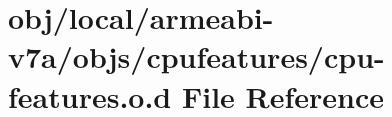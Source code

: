 \hypertarget{v7a_2objs_2cpufeatures_2cpu-features_8o_8d}{\section{obj/local/armeabi-\/v7a/objs/cpufeatures/cpu-\/features.o.\-d \-File \-Reference}
\label{v7a_2objs_2cpufeatures_2cpu-features_8o_8d}
}
